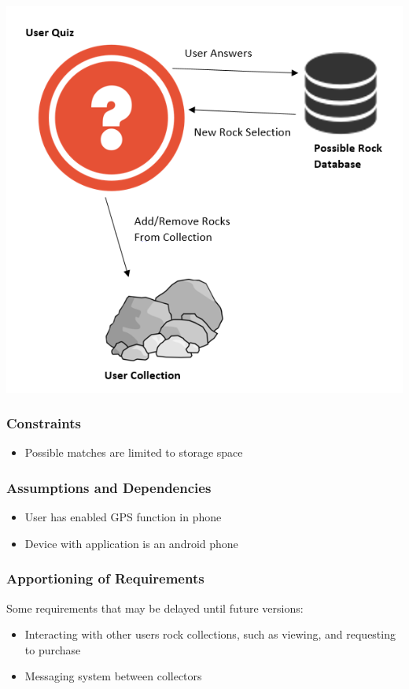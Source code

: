 \documentclass[titlepage]{article}
\begin{document}
\includegraphics{../resources/Interaction.png}

\subsubsection{Constraints}
\begin{itemize}
	\item Possible matches are limited to storage space\\
\end{itemize}

\subsubsection{Assumptions and Dependencies}
\begin{itemize}
	\item User has enabled GPS function in phone\\
	\item Device with application is an android phone\\
\end{itemize}

\subsubsection{Apportioning of Requirements}
Some requirements that may be delayed until future versions:
\begin{itemize}
	\item Interacting with other users rock collections, such as viewing, and requesting to purchase \\
	\item Messaging system between collectors \\
\end{itemize}
\end{document}
